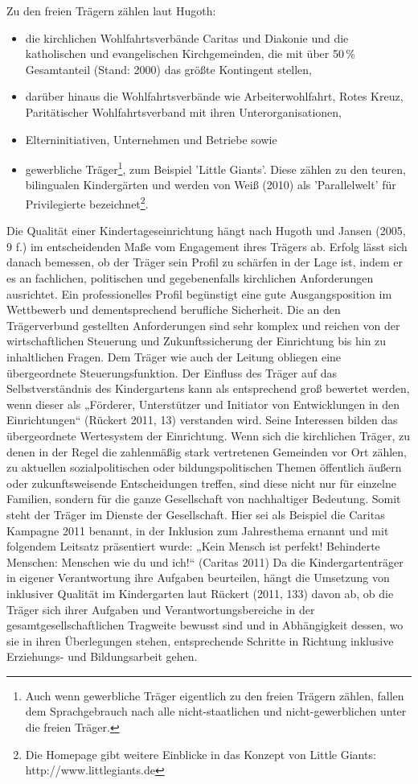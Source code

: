 Zu den freien Trägern zählen laut Hugoth: 
\begin{itemize}
\item die kirchlichen Wohlfahrtsverbände Caritas und Diakonie und die katholischen und evangelischen Kirchgemeinden, die mit über 50\,\%
Gesamtanteil (Stand: 2000) das größte Kontingent stellen, 
\item darüber hinaus die Wohlfahrtsverbände wie Arbeiterwohlfahrt, Rotes Kreuz, Paritätischer Wohlfahrtsverband mit ihren Unterorganisationen,
\item Elterninitiativen, Unternehmen und Betriebe sowie
\item gewerbliche Träger\footnote{Auch wenn gewerbliche Träger eigentlich zu den freien Trägern zählen, fallen dem Sprachgebrauch nach alle nicht-staatlichen und nicht-gewerblichen unter die freien Träger.}, zum Beispiel 'Little Giants'. Diese zählen zu den teuren, bilingualen Kindergärten und werden von Weiß (2010) als 'Parallelwelt' für Privilegierte bezeichnet\footnote{Die Homepage gibt weitere Einblicke in das Konzept von Little Giants: http://www.littlegiants.de}.      
\end{itemize}

Die Qualität einer Kindertageseinrichtung hängt nach Hugoth und Jansen (2005, 9 f.) im entscheidenden Maße vom Engagement ihres Trägers ab. Erfolg lässt sich danach bemessen, ob der Träger sein Profil zu schärfen in der Lage ist, indem er es an fachlichen, politischen und gegebenenfalls kirchlichen Anforderungen ausrichtet. Ein professionelles Profil begünstigt eine gute Ausgangsposition im Wettbewerb und dementsprechend berufliche Sicherheit. Die an den Trägerverbund gestellten Anforderungen sind sehr komplex und reichen von der wirtschaftlichen Steuerung und Zukunftssicherung der Einrichtung bis hin zu inhaltlichen Fragen. Dem Träger wie auch der Leitung obliegen eine übergeordnete Steuerungsfunktion. Der Einfluss des Träger auf das Selbstverständnis des Kindergartens kann als entsprechend groß bewertet werden, wenn dieser als „Förderer, Unterstützer und Initiator von Entwicklungen in den Einrichtungen“ (Rückert 2011, 13) verstanden wird. Seine Interessen bilden das übergeordnete Wertesystem der Einrichtung. Wenn sich die kirchlichen Träger, zu denen in der Regel die zahlenmäßig stark vertretenen Gemeinden vor Ort zählen, zu aktuellen sozialpolitischen oder bildungspolitischen Themen öffentlich äußern oder zukunftsweisende Entscheidungen treffen, sind diese nicht nur für einzelne Familien, sondern für die ganze Gesellschaft von nachhaltiger Bedeutung. Somit steht der Träger im Dienste der Gesellschaft. Hier sei als Beispiel die Caritas Kampagne 2011 benannt, in der Inklusion zum Jahresthema ernannt und mit folgendem Leitsatz präsentiert wurde: „Kein Mensch ist perfekt! Behinderte Menschen: Menschen wie du und ich!“ (Caritas 2011) Da die Kindergartenträger in eigener Verantwortung ihre Aufgaben beurteilen, hängt die Umsetzung von inklusiver Qualität im Kindergarten laut Rückert (2011, 133) davon ab,  ob die Träger sich ihrer Aufgaben und Verantwortungsbereiche in der gesamtgesellschaftlichen Tragweite bewusst sind und in Abhängigkeit dessen, wo sie in ihren Überlegungen stehen, entsprechende Schritte in Richtung inklusive Erziehungs- und Bildungsarbeit gehen.  
   
